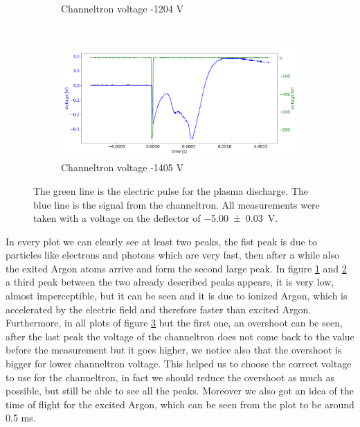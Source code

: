 \documentclass[a4paper,10pt]{article}
\begin{document}
\begin{figure}[H]
\begin{subfigure}[t]{0.45 \textwidth}
    \caption{Channeltron voltage -1204 V}\label{channeltron3}
  \end{subfigure}
  ~
  \begin{subfigure}[t]{0.45 \textwidth}
    \centering
    \includegraphics[width=\textwidth]{channeltron5}
    \caption{Channeltron voltage -1405 V}\label{channeltron4}
  \end{subfigure}
  \caption{The green line is the electric pulse for the plasma discharge. The blue line is the signal from the channeltron. All measurements were taken with a voltage on the deflector of \SI{-5.00(3)}{\volt}. }
  \label{channeltron}
\end{figure}
In every plot we can clearly see at least two peaks, the fist peak is due to particles like electrons and photons which are very fast, then after a while also the exited Argon atoms arrive and form the second large peak. In figure \ref{channeltron3} and \ref{channeltron4} a third peak between the two already described peaks appears, it is very low, almost imperceptible, but it can be seen and it is due to ionized Argon, which is accelerated by the electric field and therefore faster than excited Argon. Furthermore, in all plots of figure \ref{channeltron} but the first one, an overshoot can be seen, after the last peak the voltage of the channeltron does not come back to the value before the measurement but it goes higher, we notice also that the overshoot is bigger for lower channeltron voltage. This helped us to choose the correct voltage to use for the channeltron, in fact we should reduce the overshoot as much as possible, but still be able to see all the peaks. Moreover we also got an idea of the time of flight for the excited Argon, which can be seen from the plot to be around 0.5 ms.
\end{document}
